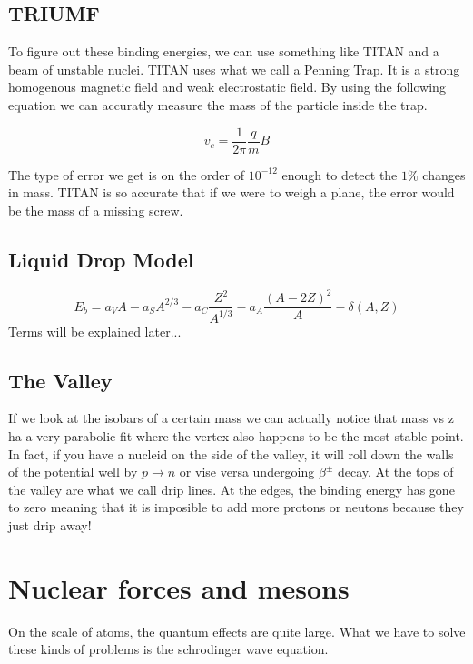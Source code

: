 \documentclass[english, 11pt]{article}
\begin{document}
      \subsection{TRIUMF}

      To figure out these binding energies, we can use something like TITAN and a beam of unstable nuclei. TITAN uses what we call a Penning Trap. It is a strong homogenous magnetic field and weak electrostatic field. By using the following equation we can accuratly measure the mass of the particle inside the trap.

      \[ v_c = \frac{1}{2\pi}\frac{q}{m}B\]

      The type of error we get is on the order of $10^{-12}$ enough to detect the $1\%$ changes in mass. TITAN is so accurate that if we were to weigh a plane, the error would be the mass of a missing screw.

      \subsection{Liquid Drop Model}
      \begin{defn}\label{ldm}
      \[ E_b = a_V A-a_S A^{2/3} - a_C \frac{Z^2}{A^{1/3}} - a_A \frac{(A-2Z)^2}{A} - \delta(A,Z) \]
      Terms will be explained later...
      \end{defn}

      \subsection{The Valley}
      If we look at the isobars of a certain mass we can actually notice that mass vs z ha a very parabolic fit where the vertex also happens to be the most stable point. In fact, if you have a nucleid on the side of the valley, it will roll down the walls of the potential well by $p \rightarrow n$ or vise versa undergoing $\beta^{\pm}$ decay. At the tops of the valley are what we call drip lines. At the edges, the binding energy has gone to zero meaning that it is imposible to add more protons or neutons because they just drip away!


      \section{Nuclear forces and mesons}

      On the scale of atoms, the quantum effects are quite large. What we have to solve these kinds of problems is the schrodinger wave equation.
\end{document}
